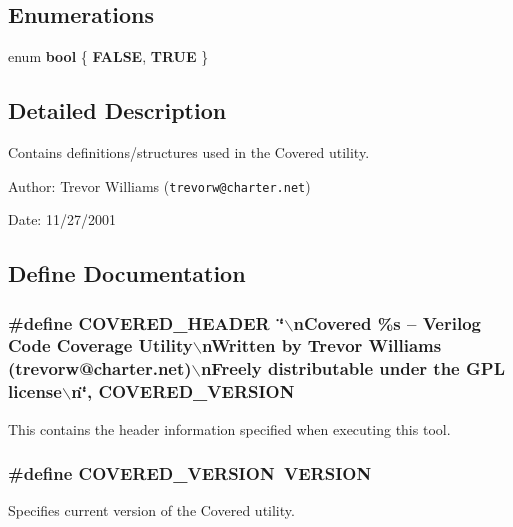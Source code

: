 \subsection*{Enumerations}
\begin{CompactItemize}
\item 
enum {\bf bool} \{ {\bf FALSE}, 
{\bf TRUE}
 \}
\end{CompactItemize}


\subsection{Detailed Description}
Contains definitions/structures used in the Covered utility.

\begin{Desc}
\item[Author:]Trevor Williams ({\tt trevorw@charter.net}) \end{Desc}
\begin{Desc}
\item[Date:]11/27/2001 \end{Desc}


\subsection{Define Documentation}
\subsubsection{\setlength{\rightskip}{0pt plus 5cm}\#define COVERED\_\-HEADER\ \char`\"{}$\backslash$n\-Covered \%s -- Verilog Code Coverage Utility$\backslash$n\-Written by Trevor Williams  (trevorw@charter.net)$\backslash$n\-Freely distributable under the GPL license$\backslash$n\char`\"{}, COVERED\_\-VERSION}\label{defines_8h_a1}


This contains the header information specified when executing this tool. 
\subsubsection{\setlength{\rightskip}{0pt plus 5cm}\#define COVERED\_\-VERSION\ VERSION}\label{defines_8h_a0}


Specifies current version of the Covered utility. 
